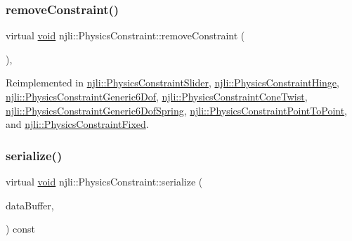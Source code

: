 \subsubsection{\texorpdfstring{remove\+Constraint()}{removeConstraint()}}
{\footnotesize\ttfamily virtual \mbox{\hyperlink{_thread_8h_af1e856da2e658414cb2456cb6f7ebc66}{void}} njli\+::\+Physics\+Constraint\+::remove\+Constraint (\begin{DoxyParamCaption}{ }\end{DoxyParamCaption})\hspace{0.3cm}{\ttfamily [protected]}, {\ttfamily [virtual]}}



Reimplemented in \mbox{\hyperlink{classnjli_1_1_physics_constraint_slider_a86bb3a2cb9397577d6f4003c1ff9a2b2}{njli\+::\+Physics\+Constraint\+Slider}}, \mbox{\hyperlink{classnjli_1_1_physics_constraint_hinge_aad341621e3585f5f8c3c2b4d369be7e2}{njli\+::\+Physics\+Constraint\+Hinge}}, \mbox{\hyperlink{classnjli_1_1_physics_constraint_generic6_dof_ac57766961297ad087fb0ee7dc26e17d8}{njli\+::\+Physics\+Constraint\+Generic6\+Dof}}, \mbox{\hyperlink{classnjli_1_1_physics_constraint_cone_twist_a975d5736a7ef4c440f9138dfdfcec357}{njli\+::\+Physics\+Constraint\+Cone\+Twist}}, \mbox{\hyperlink{classnjli_1_1_physics_constraint_generic6_dof_spring_ad8d9013c4e17710207f13cf40d667cd1}{njli\+::\+Physics\+Constraint\+Generic6\+Dof\+Spring}}, \mbox{\hyperlink{classnjli_1_1_physics_constraint_point_to_point_a337401a0a9ad667b5d7c952913c40852}{njli\+::\+Physics\+Constraint\+Point\+To\+Point}}, and \mbox{\hyperlink{classnjli_1_1_physics_constraint_fixed_a6b0a9ef970808875deef88a91f59f8b7}{njli\+::\+Physics\+Constraint\+Fixed}}.

\mbox{\label{classnjli_1_1_physics_constraint_ae294d089963246a8e65b41913730efb1}} 
\subsubsection{\texorpdfstring{serialize()}{serialize()}}
{\footnotesize\ttfamily virtual \mbox{\hyperlink{_thread_8h_af1e856da2e658414cb2456cb6f7ebc66}{void}} njli\+::\+Physics\+Constraint\+::serialize (\begin{DoxyParamCaption}\item[{\mbox{\hyperlink{_thread_8h_af1e856da2e658414cb2456cb6f7ebc66}{void}} $\ast$}]{data\+Buffer,  }\item[{bt\+Serializer $\ast$}]{ }\end{DoxyParamCaption}) const\hspace{0.3cm}{\ttfamily [virtual]}}



